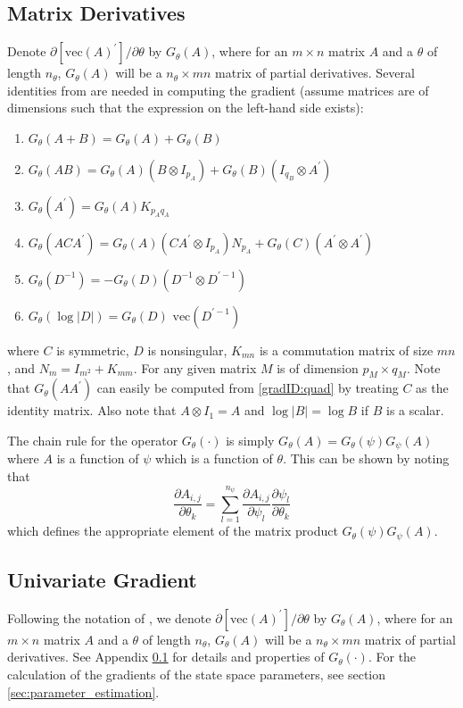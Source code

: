 \documentclass[12pt]{article}
\newcommand{\Gt}{G_\theta}
\newcommand{\vecop}[0]{\text{vec}}
\begin{document}
\subsection{Matrix Derivatives}
	\label{sec:gradient_derivation}
	Denote $\partial \left[ \vecop(A)^\prime \right] / \partial \theta$ by $\Gt(A)$, where for an $m \times n$ matrix $A$ and a $\theta$ of length $n_\theta$, $\Gt(A)$ will be a $n_\theta \times mn$ matrix of partial derivatives. Several identities from \cite{nagakura} are needed in computing the gradient (assume matrices are of dimensions such that the expression on the left-hand side exists):

	\begin{enumerate}[label=(\alph*)]
	\item \label{gradID:sum} $\Gt(A + B) = \Gt(A) + \Gt(B)$
	\item \label{gradID:mult} $\Gt(A B) = \Gt(A) (B \otimes I_{p_A}) + \Gt(B)(I_{q_B} \otimes A^\prime)$
	\item \label{gradID:trans} $\Gt(A^\prime) = \Gt(A) K_{p_A q_A}$ 
	\item \label{gradID:quad} $\Gt(ACA^\prime) = \Gt(A)(CA^\prime \otimes I_{p_A}) N_{p_A} + \Gt(C)(A^\prime \otimes A^\prime)$
	\item \label{gradID:inv} $\Gt(D^{-1}) = -\Gt(D)(D^{-1} \otimes D^{\prime-1})$ 
	\item \label{gradID:logdet} $\Gt(\log |D|) = \Gt(D) \text{ vec} (D^{\prime-1})$
	\end{enumerate}
	where $C$ is symmetric, $D$ is nonsingular, $K_{mn}$ is a commutation matrix of size $mn$, and $N_m = I_{m^2} + K_{mm}$. For any given matrix $M$ is of dimension $p_M \times q_M$. Note that $\Gt(AA^\prime)$ can easily be computed from \ref{gradID:quad} by treating $C$ as the identity matrix. Also note that $A \otimes I_1 = A$ and $\log |B| = \log B$ if $B$ is a scalar. 

	The chain rule for the operator $\Gt(\cdot)$ is simply $\Gt(A) = \Gt(\psi) G_\psi(A)$ where $A$ is a function of $\psi$ which is a function of $\theta$. This can be shown by noting that 
	\begin{equation*}
	\frac{\partial A_{i,j}}{\partial \theta_k} = \sum_{l = 1}^{n_\psi} \frac{\partial A_{i,j}}{\partial \psi_l} \frac{\partial \psi_l}{\partial \theta_k}
	\end{equation*}
	which defines the appropriate element of the matrix product $\Gt(\psi)G_\psi(A)$.

\subsection{Univariate Gradient}
	Following the notation of \cite{nagakura}, we denote $\partial \left[ \vecop(A)^\prime \right] / \partial \theta$ by $\Gt(A)$, where for an $m \times n$ matrix $A$ and a $\theta$ of length $n_\theta$, $\Gt(A)$ will be a $n_\theta \times mn$ matrix of partial derivatives. See Appendix \ref{sec:gradient_derivation} for details and properties of $\Gt(\cdot)$. For the calculation of the gradients of the state space parameters, see section \ref{sec:parameter_estimation}.
\end{document}
